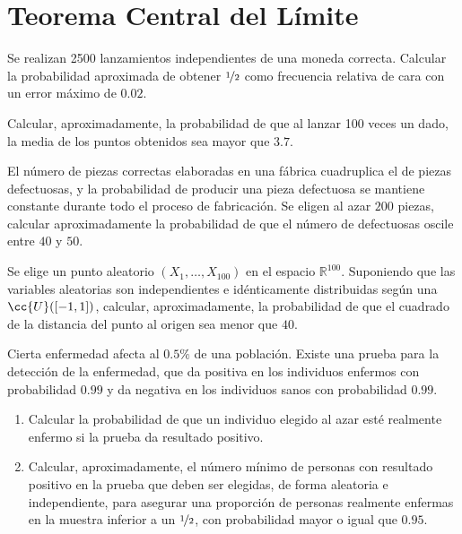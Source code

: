 \section{Teorema Central del Límite}

\begin{ejercicio}
    Se realizan 2500 lanzamientos independientes de una moneda correcta. Calcular la probabilidad aproximada de obtener $\nicefrac{1}{2}$ como frecuencia relativa de cara con un error máximo de $0.02$.
\end{ejercicio}

\begin{ejercicio}
    Calcular, aproximadamente, la probabilidad de que al lanzar 100 veces un dado, la media de los puntos obtenidos sea mayor que $3.7$.
\end{ejercicio}

\begin{ejercicio}
    El número de piezas correctas elaboradas en una fábrica cuadruplica el de piezas defectuosas, y la probabilidad de producir una pieza defectuosa se mantiene constante durante todo el proceso de fabricación. Se eligen al azar $200$ piezas, calcular aproximadamente la probabilidad de que el número de defectuosas oscile entre $40$ y $50$.
\end{ejercicio}

\begin{ejercicio}
    Se elige un punto aleatorio $(X_1, \ldots, X_{100})$ en el espacio $\mathbb{R}^{100}$. Suponiendo que las variables aleatorias son independientes e idénticamente distribuidas según una $\cc{U}([-1, 1])$, calcular, aproximadamente, la probabilidad de que el cuadrado de la distancia del punto al origen sea menor que $40$.
\end{ejercicio}

\begin{ejercicio}
    Cierta enfermedad afecta al $0.5\%$ de una población. Existe una prueba para la detección de la enfermedad, que da positiva en los individuos enfermos con probabilidad $0.99$ y da negativa en los individuos sanos con probabilidad $0.99$.
    \begin{enumerate}
        \item Calcular la probabilidad de que un individuo elegido al azar esté realmente enfermo si la prueba da resultado positivo.
        \item Calcular, aproximadamente, el número mínimo de personas con resultado positivo en la prueba que deben ser elegidas, de forma aleatoria e independiente, para asegurar una proporción de personas realmente enfermas en la muestra inferior a un $\nicefrac{1}{2}$, con probabilidad mayor o igual que $0.95$.
    \end{enumerate}
\end{ejercicio}


